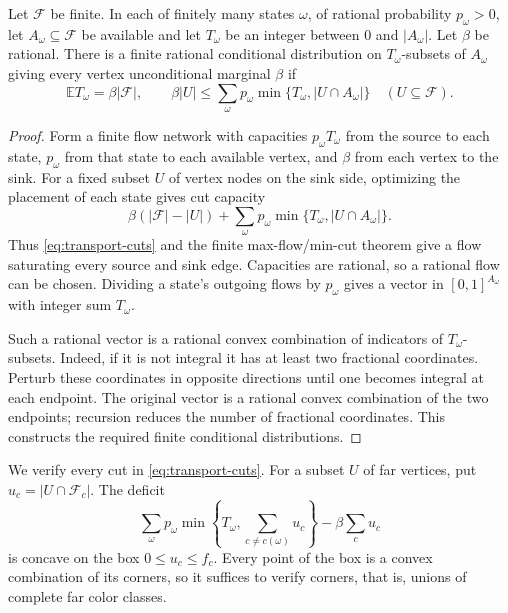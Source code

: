 \begin{lemma}
\label{lem:transport}
Let $\mathcal F$ be finite.  In each of finitely many states $\omega$,
of rational probability $p_\omega>0$, let $A_\omega\subseteq\mathcal F$
be available and let $T_\omega$ be an integer between $0$ and
$|A_\omega|$.  Let $\beta$ be rational.  There is a finite rational
conditional distribution on $T_\omega$-subsets of $A_\omega$ giving
every vertex unconditional marginal $\beta$ if
\begin{equation}
 \mathbb E T_\omega=\beta|\mathcal F|,\qquad
 \beta|U|\le\sum_\omega p_\omega
             \min\{T_\omega,|U\cap A_\omega|\}\quad(U\subseteq\mathcal F).
 \label{eq:transport-cuts}
\end{equation}
\end{lemma}
\begin{proof}
Form a finite flow network with capacities $p_\omega T_\omega$ from
the source to each state, $p_\omega$ from that state to each available
vertex, and $\beta$ from each vertex to the sink.  For a fixed subset
$U$ of vertex nodes on the sink side, optimizing the placement of each
state gives cut capacity
\[
 \beta(|\mathcal F|-|U|)+
   \sum_\omega p_\omega\min\{T_\omega,|U\cap A_\omega|\}.
\]
Thus \eqref{eq:transport-cuts} and the finite max-flow/min-cut theorem
give a flow saturating every source and sink edge.  Capacities are
rational, so a rational flow can be chosen.  Dividing a state's outgoing
flows by $p_\omega$ gives a vector in $[0,1]^{A_\omega}$ with integer
sum $T_\omega$.

Such a rational vector is a rational convex combination of indicators
of $T_\omega$-subsets.  Indeed, if it is not integral it has at least
two fractional coordinates.  Perturb these coordinates in opposite
directions until one becomes integral at each endpoint.  The original
vector is a rational convex combination of the two endpoints; recursion
reduces the number of fractional coordinates.  This constructs the
required finite conditional distributions.
\end{proof}

We verify every cut in \eqref{eq:transport-cuts}.  For a subset $U$ of
far vertices, put $u_c=|U\cap\mathcal F_c|$.  The deficit
\[
 \sum_\omega p_\omega
   \min\left\{T_\omega,\sum_{c\ne c(\omega)}u_c\right\}
       -\beta\sum_c u_c
\]
is concave on the box $0\le u_c\le f_c$.  Every point of the box is a
convex combination of its corners, so it suffices to verify corners,
that is, unions of complete far color classes.

